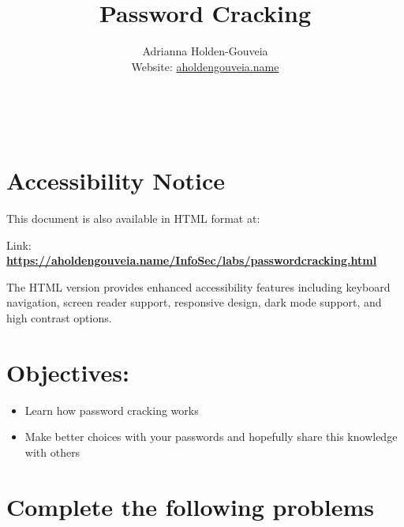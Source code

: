 \documentclass[12pt]{article}
\title{Password Cracking}
\author{
        Adrianna Holden-Gouveia \\
        Website: \href{https://aholdengouveia.name}{aholdengouveia.name}\\ 
        \date{\vspace{-5ex}}
        \faGithub {: aholdengouveia} \\
        \faTwitter {: aholdengouveia} \\
        }
\begin{document}
    

\maketitle

\section*{Accessibility Notice}
This document is also available in HTML format at:

Link: \href{https://aholdengouveia.name/InfoSec/labs/passwordcracking.html}{\textbf{https://aholdengouveia.name/InfoSec/labs/passwordcracking.html}}

The HTML version provides enhanced accessibility features including keyboard navigation, screen reader support, responsive design, dark mode support, and high contrast options.



\section*{Objectives:}
\begin{itemize}
    \item Learn how password cracking works    
    \item Make better choices with your passwords and hopefully share this knowledge with others
\end{itemize}
\section*{Complete the following problems}

\end{document}
